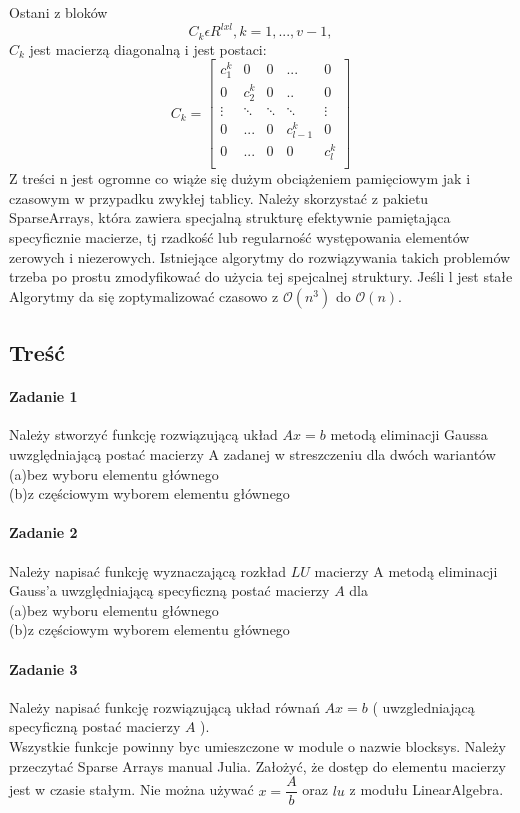 \documentclass[11pt]{article}
\begin{document}
\begin{flushleft}
\[\]
Ostani z bloków $$C_k \epsilon R^{lxl}, k = 1,...,v-1  ,$$ $C_k$ jest macierzą diagonalną i jest postaci:
\[
C_k=\begin{bmatrix}
      c^k_1 & 0 & 0 & ... & 0 \\
    0 & c^k_2 & 0 & .. & 0 \\
    \vdots & \ddots & \ddots & \ddots & \vdots \\
     0 & ... & 0 & c^k_{l-1} & 0 \\
      0 & ... & 0 & 0 & c^k_l \\
  \end{bmatrix}
\]
Z treści n jest ogromne co wiąże się dużym obciążeniem pamięciowym jak i czasowym w przypadku zwykłej tablicy. Należy skorzystać z pakietu SparseArrays, która zawiera specjalną strukturę efektywnie pamiętająca specyficznie macierze, tj rzadkość lub regularność występowania elementów zerowych i niezerowych. Istniejące algorytmy do rozwiązywania takich problemów trzeba po prostu zmodyfikować do użycia tej spejcalnej struktury. Jeśli l jest stałe Algorytmy da się zoptymalizować czasowo z $\mathcal{O}(n^3)$ do  $\mathcal{O}(n)$.\\
\subsection{Treść}
\paragraph{Zadanie 1} Należy stworzyć funkcję rozwiązującą układ $Ax=b$ metodą eliminacji Gaussa uwzględniającą postać macierzy A zadanej w streszczeniu dla dwóch wariantów \\ (a)bez wyboru elementu głównego \\(b)z częściowym wyborem elementu głównego\\ \paragraph{Zadanie 2} Należy napisać funkcję wyznaczającą rozkład $LU$ macierzy A metodą eliminacji Gauss'a uwzględniającą specyficzną postać macierzy $A$ dla \\ (a)bez wyboru elementu głównego \\(b)z częściowym wyborem elementu głównego \\ \paragraph{Zadanie 3} Należy napisać funkcję rozwiązującą układ równań $Ax=b$ ( uwzgledniającą specyficzną postać macierzy $A$ ).\\
\bigskip
Wszystkie funkcje powinny byc umieszczone w module o nazwie blocksys. Należy przeczytać Sparse Arrays manual Julia. Założyć, że dostęp do elementu macierzy jest w czasie stałym. Nie można używać $x=\dfrac{A}{b}$ oraz $lu$ z modułu LinearAlgebra.

\end{flushleft}
\end{document}
